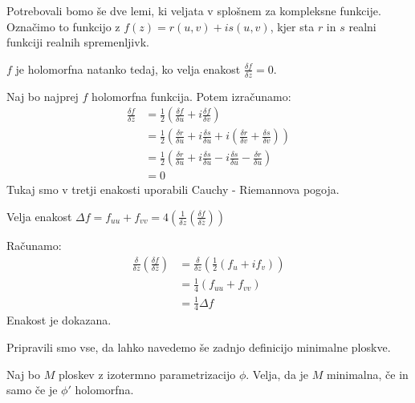 \documentclass[mat1]{fmfdelo}
\begin{document}
Potrebovali bomo še dve lemi, ki veljata v splošnem za kompleksne funkcije. 
Označimo to funkcijo z $f (z) = r (u, v) + i s (u, v)$, kjer sta $r$ in $s$ realni funkciji realnih spremenljivk.

\begin{lema}
    $f$ je holomorfna natanko tedaj, ko velja enakost $ \frac{\delta f}{\delta \bar{z}} = 0$.
\end{lema}

\begin{dokaz}
    Naj bo najprej $f$ holomorfna funkcija. Potem izračunamo:
    \begin{align*}
        \frac{\delta f}{\delta \bar{z}} &= \frac{1}{2} \left( \frac{\delta f}{\delta u} + i \frac{\delta f}{\delta v} \right) \\
        &= \frac{1}{2} \left( \frac{\delta r}{\delta u} + i \frac{\delta s}{\delta u} + i \left( \frac{\delta r}{\delta v} + \frac{\delta s}{\delta v} \right) \right) \\
        &= \frac{1}{2} \left( \frac{\delta r}{\delta u} + i \frac{\delta s}{\delta u} - i \frac{\delta s}{\delta u} - \frac{\delta r}{\delta u} \right) \\
        &= 0
    \end{align*}
    Tukaj smo v tretji enakosti uporabili Cauchy - Riemannova pogoja.
    
\end{dokaz}

\begin{lema}
    Velja enakost $\Delta f = f_{uu} + f_{vv} = 4 \left( \frac{1}{\delta z} \left( \frac{\delta f}{\delta \bar{z}} \right)\right)$
\end{lema}

\begin{dokaz}
    Računamo:
    \begin{align*}
        \frac{\delta}{\delta z} \left( \frac{\delta f}{\delta \bar{z}} \right) &=
        \frac{\delta}{\delta z} \left( \frac{1}{2} \left( f_u + i f_v \right) \right) \\
        &= \frac{1}{4} \left( f_{uu} + f_{vv} \right) \\
        &= \frac{1}{4} \Delta f
    \end{align*}
    Enakost je dokazana.
\end{dokaz}


Pripravili smo vse, da lahko navedemo še zadnjo definicijo minimalne ploskve.

\begin{trditev}
    Naj bo $M$ ploskev z izotermno parametrizacijo $\phi$. Velja, da je $M$ minimalna, če in samo če je $\phi'$ holomorfna.
\end{trditev}
\end{document}
